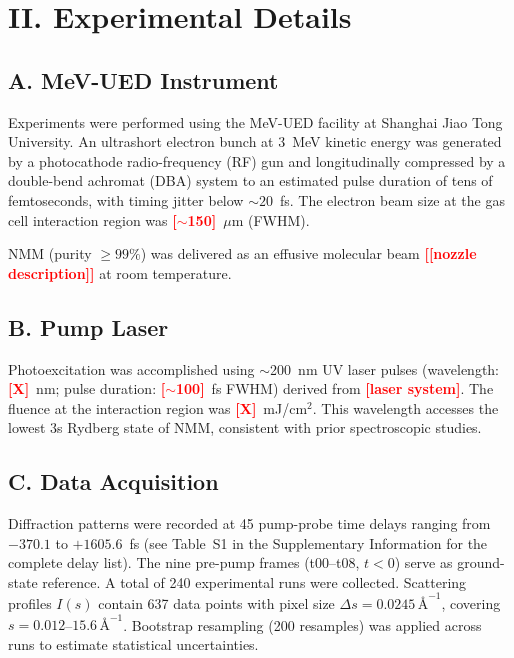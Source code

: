 \documentclass[12pt]{article}
\newcommand{\anginv}{\,\text{\AA}^{-1}}
\newcommand{\TBD}[1]{\textcolor{red}{\textbf{[#1]}}}
\begin{document}
\section*{II.\; Experimental Details}

\subsection*{A.\; MeV-UED Instrument}

Experiments were performed using the MeV-UED facility at Shanghai
Jiao Tong University.\cite{Qi2020} An ultrashort electron bunch at
3~MeV kinetic energy was generated by a photocathode radio-frequency
(RF) gun and longitudinally compressed by a double-bend achromat (DBA)
system to an estimated pulse duration of tens of femtoseconds, with
timing jitter below $\sim 20$~fs. The electron beam size at the gas
cell interaction region was \TBD{$\sim$150}~$\mu$m (FWHM).

NMM (purity $\geq 99\%$) was delivered as an effusive molecular beam
\TBD{[nozzle description]} at room temperature.

\subsection*{B.\; Pump Laser}

Photoexcitation was accomplished using $\sim$200~nm UV laser pulses
(wavelength: \TBD{X}~nm; pulse duration: \TBD{$\sim$100}~fs FWHM)
derived from \TBD{laser system}. The fluence at the interaction region
was \TBD{X}~mJ/cm$^2$. This wavelength accesses the lowest 3s Rydberg
state of NMM, consistent with prior spectroscopic studies.\cite{Zhang2017}

\subsection*{C.\; Data Acquisition}

Diffraction patterns were recorded at 45 pump-probe time delays
ranging from $-370.1$ to $+1605.6$~fs (see Table~S1 in the
Supplementary Information for the complete delay list). The nine
pre-pump frames (t00--t08, $t < 0$) serve as ground-state reference.
A total of 240 experimental runs were collected. Scattering profiles
$I(s)$ contain 637 data points with pixel size
$\Delta s = 0.0245\anginv$, covering $s = 0.012$--$15.6\anginv$.
Bootstrap resampling (200 resamples) was applied across runs to
estimate statistical uncertainties.
\end{document}
